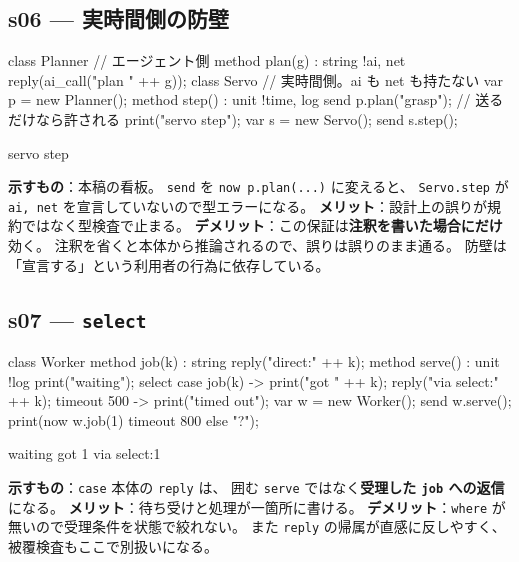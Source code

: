 \documentclass[11pt,a4paper]{ltjsarticle}
\theoremstyle{definition}
\theoremstyle{remark}
\begin{document}
\subsection{s06 --- 実時間側の防壁}
\begin{aipl}
class Planner {                       // エージェント側
  method plan(g) : string !{ai, net} { reply(ai_call("plan " ++ g)); }
}
class Servo {                         // 実時間側。ai も net も持たない
  var p = new Planner();
  method step() : unit !{time, log} {
    send p.plan("grasp");             // 送るだけなら許される
    print("servo step");
  }
}
var s = new Servo();
send s.step();
\end{aipl}
\begin{term}
servo step
\end{term}
\textbf{示すもの}：本稿の看板。
\texttt{send} を \texttt{now p.plan(...)} に変えると、
\texttt{Servo.step} が \texttt{ai, net} を宣言していないので型エラーになる。
\textbf{メリット}：設計上の誤りが規約ではなく型検査で止まる。
\textbf{デメリット}：この保証は\textbf{注釈を書いた場合にだけ}効く。
注釈を省くと本体から推論されるので、誤りは誤りのまま通る。
防壁は「宣言する」という利用者の行為に依存している。

\subsection{s07 --- \texttt{select}}
\begin{aipl}
class Worker {
  method job(k) : string { reply("direct:" ++ k); }
  method serve() : unit !{log} {
    print("waiting");
    select {
      case job(k) -> { print("got " ++ k); reply("via select:" ++ k); }
      timeout 500 -> { print("timed out"); }
    }
  }
}
var w = new Worker();
send w.serve();
print(now w.job(1) timeout 800 else "?");
\end{aipl}
\begin{term}
waiting
got 1
via select:1
\end{term}
\textbf{示すもの}：\texttt{case} 本体の \texttt{reply} は、
囲む \texttt{serve} ではなく\textbf{受理した \texttt{job} への返信}になる。
\textbf{メリット}：待ち受けと処理が一箇所に書ける。
\textbf{デメリット}：\texttt{where} が無いので受理条件を状態で絞れない。
また \texttt{reply} の帰属が直感に反しやすく、被覆検査もここで別扱いになる。
\end{document}
